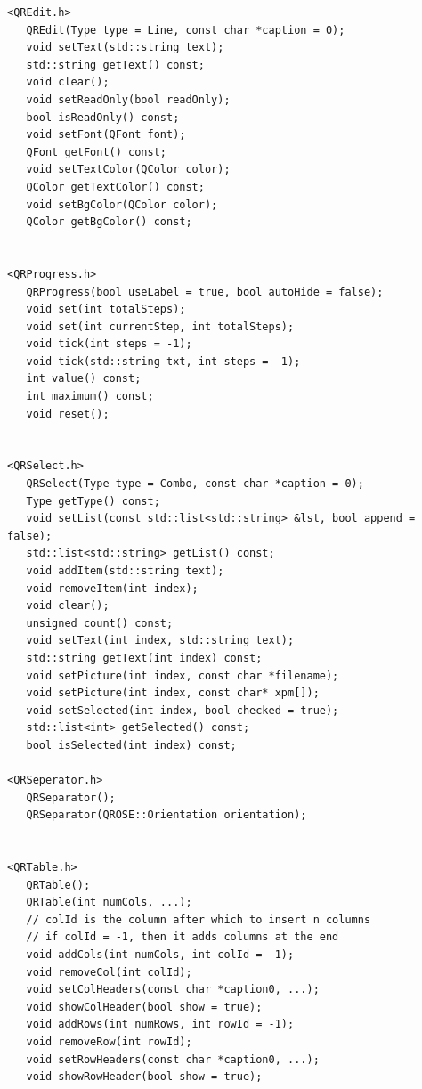 \begin{enumerate}
\begin{lstlisting}
<QREdit.h>
   QREdit(Type type = Line, const char *caption = 0);
   void setText(std::string text);
   std::string getText() const;   
   void clear();
   void setReadOnly(bool readOnly);
   bool isReadOnly() const;
   void setFont(QFont font);
   QFont getFont() const;
   void setTextColor(QColor color);
   QColor getTextColor() const;   
   void setBgColor(QColor color);
   QColor getBgColor() const;


<QRProgress.h>
   QRProgress(bool useLabel = true, bool autoHide = false);
   void set(int totalSteps);
   void set(int currentStep, int totalSteps);
   void tick(int steps = -1);
   void tick(std::string txt, int steps = -1);
   int value() const;
   int maximum() const;
   void reset();


<QRSelect.h>
   QRSelect(Type type = Combo, const char *caption = 0);
   Type getType() const;
   void setList(const std::list<std::string> &lst, bool append = false);   
   std::list<std::string> getList() const;
   void addItem(std::string text);
   void removeItem(int index);
   void clear();
   unsigned count() const;
   void setText(int index, std::string text);
   std::string getText(int index) const;
   void setPicture(int index, const char *filename);
   void setPicture(int index, const char* xpm[]);
   void setSelected(int index, bool checked = true);
   std::list<int> getSelected() const;
   bool isSelected(int index) const;

<QRSeperator.h>
   QRSeparator();
   QRSeparator(QROSE::Orientation orientation);


<QRTable.h>
   QRTable();
   QRTable(int numCols, ...);
   // colId is the column after which to insert n columns
   // if colId = -1, then it adds columns at the end
   void addCols(int numCols, int colId = -1);
   void removeCol(int colId);   
   void setColHeaders(const char *caption0, ...);
   void showColHeader(bool show = true);
   void addRows(int numRows, int rowId = -1);
   void removeRow(int rowId);
   void setRowHeaders(const char *caption0, ...);
   void showRowHeader(bool show = true);


\end{lstlisting}
\end{enumerate}
